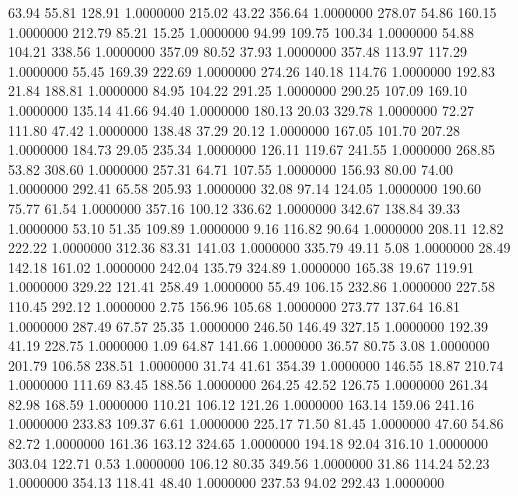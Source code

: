   63.94   55.81  128.91   1.0000000
 215.02   43.22  356.64   1.0000000
 278.07   54.86  160.15   1.0000000
 212.79   85.21   15.25   1.0000000
  94.99  109.75  100.34   1.0000000
  54.88  104.21  338.56   1.0000000
 357.09   80.52   37.93   1.0000000
 357.48  113.97  117.29   1.0000000
  55.45  169.39  222.69   1.0000000
 274.26  140.18  114.76   1.0000000
 192.83   21.84  188.81   1.0000000
  84.95  104.22  291.25   1.0000000
 290.25  107.09  169.10   1.0000000
 135.14   41.66   94.40   1.0000000
 180.13   20.03  329.78   1.0000000
  72.27  111.80   47.42   1.0000000
 138.48   37.29   20.12   1.0000000
 167.05  101.70  207.28   1.0000000
 184.73   29.05  235.34   1.0000000
 126.11  119.67  241.55   1.0000000
 268.85   53.82  308.60   1.0000000
 257.31   64.71  107.55   1.0000000
 156.93   80.00   74.00   1.0000000
 292.41   65.58  205.93   1.0000000
  32.08   97.14  124.05   1.0000000
 190.60   75.77   61.54   1.0000000
 357.16  100.12  336.62   1.0000000
 342.67  138.84   39.33   1.0000000
  53.10   51.35  109.89   1.0000000
   9.16  116.82   90.64   1.0000000
 208.11   12.82  222.22   1.0000000
 312.36   83.31  141.03   1.0000000
 335.79   49.11    5.08   1.0000000
  28.49  142.18  161.02   1.0000000
 242.04  135.79  324.89   1.0000000
 165.38   19.67  119.91   1.0000000
 329.22  121.41  258.49   1.0000000
  55.49  106.15  232.86   1.0000000
 227.58  110.45  292.12   1.0000000
   2.75  156.96  105.68   1.0000000
 273.77  137.64   16.81   1.0000000
 287.49   67.57   25.35   1.0000000
 246.50  146.49  327.15   1.0000000
 192.39   41.19  228.75   1.0000000
   1.09   64.87  141.66   1.0000000
  36.57   80.75    3.08   1.0000000
 201.79  106.58  238.51   1.0000000
  31.74   41.61  354.39   1.0000000
 146.55   18.87  210.74   1.0000000
 111.69   83.45  188.56   1.0000000
 264.25   42.52  126.75   1.0000000
 261.34   82.98  168.59   1.0000000
 110.21  106.12  121.26   1.0000000
 163.14  159.06  241.16   1.0000000
 233.83  109.37    6.61   1.0000000
 225.17   71.50   81.45   1.0000000
  47.60   54.86   82.72   1.0000000
 161.36  163.12  324.65   1.0000000
 194.18   92.04  316.10   1.0000000
 303.04  122.71    0.53   1.0000000
 106.12   80.35  349.56   1.0000000
  31.86  114.24   52.23   1.0000000
 354.13  118.41   48.40   1.0000000
 237.53   94.02  292.43   1.0000000
